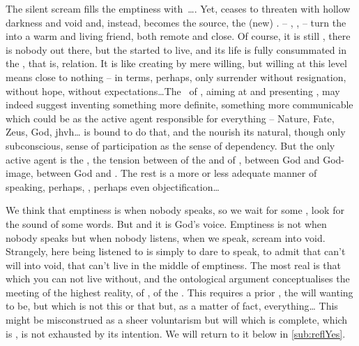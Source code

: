 \label{pre:goodfromevil}
%
The silent scream  fills the emptiness with~\ldots {}.
Yet,  ceases to threaten with hollow darkness and void and,
instead, becomes the source, the (new) .  
-- , ,  -- turn the  into a warm and living friend, both remote and close.  Of course,
it is still , there is nobody out there, but the
 started to live, and its life is fully consummated in the
, that is,  relation. It is like creating by mere
willing, but willing at this level means close to nothing -- in 
terms, perhaps, only surrender without resignation,  without hope,
 without expectations\ldots  The \sch\ of \Yes, aiming at  and
presenting , may indeed suggest inventing something more definite,
something more communicable which could be  as the active agent
responsible for everything -- Nature, Fate, Zeus, God, {\sc jhvh}\ldots  {}
is bound to do that, and the  nourish its natural, though
only subconscious, sense of participation as the sense of dependency.  But the
only active agent is the , the tension between  of
the  and  of , between God and God-image,
between God and . The rest is a more or less adequate manner of
speaking, perhaps, , perhaps even
{objectification}\ldots

We think that emptiness is when nobody speaks, so we wait for some ,
look for the sound of some words. But  and 
it is God's voice. Emptiness is
not when nobody speaks but when nobody listens, when we speak, scream into void.
Strangely, here being listened to is simply to dare to speak, to admit that
 can't will into void, that  can't live in the middle of emptiness.
The most real is that which you can not live without, and the ontological
argument conceptualises the meeting of the highest reality, of , of the .  This
requires a prior \yes, the will wanting  to be, but
 which is not this or that 
but, as a matter of fact, everything\ldots 
{}
  { This might be misconstrued as a sheer 
    voluntarism but will which is complete, which is , is
    not exhausted by its  intention. We will return to it below in
    \ref{sub:reflYes}.} 



